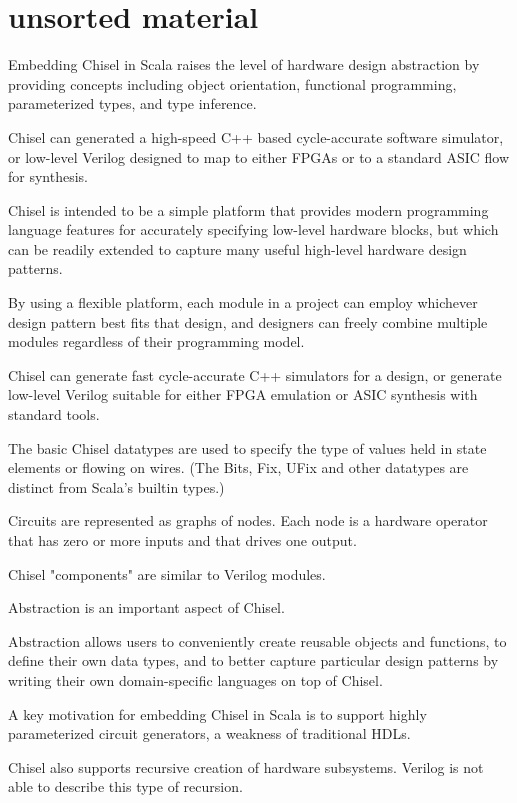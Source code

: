 \documentclass[a4paper,11pt]{article}
\begin{document}
\section{unsorted material}

Embedding Chisel in Scala raises the level of hardware design abstraction by providing concepts including object orientation, functional programming, parameterized types, and type inference.

Chisel can generated a high-speed C++ based cycle-accurate software simulator, or low-level Verilog designed to map to either FPGAs or to a standard ASIC flow for synthesis.

Chisel is intended to be a simple platform that provides modern programming language features for accurately specifying low-level hardware blocks, but which can be readily extended to capture many useful high-level hardware design patterns.

By using a flexible platform, each module in a project can employ whichever design pattern best fits that design, and designers can freely combine multiple modules regardless of their programming model.

Chisel can generate fast cycle-accurate C++ simulators for a design, or generate low-level Verilog suitable for either FPGA emulation or ASIC synthesis with standard tools.

The basic Chisel datatypes are used to specify the type of values held in state elements or flowing on wires. (The Bits, Fix, UFix and other datatypes are distinct from Scala's builtin types.)

Circuits are represented as graphs of nodes. Each node is a hardware operator that has zero or more inputs and that drives one output.

Chisel "components" are similar to Verilog modules.

Abstraction is an important aspect of Chisel.

Abstraction allows users to conveniently create reusable objects and functions, to define their own data types, and to better capture particular design patterns by writing their own domain-specific languages on top of Chisel.

A key motivation for embedding Chisel in Scala is to support highly parameterized circuit generators, a weakness of traditional HDLs.

Chisel also supports recursive creation of hardware subsystems. Verilog is not able to describe this type of recursion.
\end{document}
